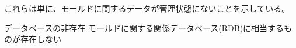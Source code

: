 これらは単に、モールドに関するデータが管理状態にないことを示している。
\begin{Issues}{データベースの非存在}
モールドに関する関係データベース(RDB)に相当するものが存在しない
\end{Issues}
